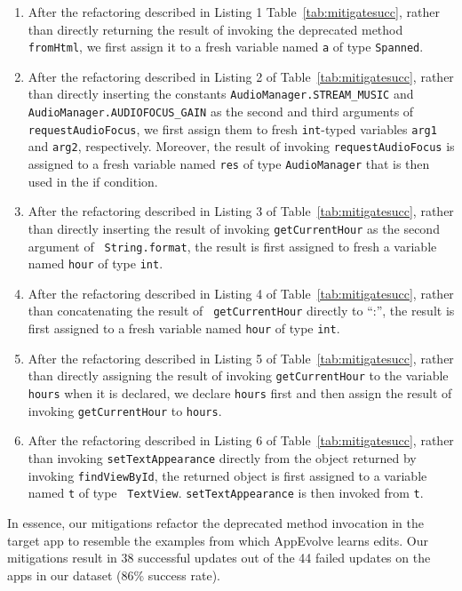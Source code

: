 \begin{enumerate}
\item After the refactoring described in Listing 1
Table~\ref{tab:mitigatesucc}, rather than directly returning the result of
invoking the deprecated method {\tt fromHtml}, we first assign it to a fresh
variable named {\tt a} of type {\tt Spanned}.

\item After the refactoring described in Listing 2 of
Table~\ref{tab:mitigatesucc}, rather than directly inserting the constants
{\tt AudioManager.STREAM\_MUSIC} and {\tt AudioManager.AUDIOFOCUS\_GAIN} as
the second and third arguments of {\tt requestAudioFocus}, we first assign
them to fresh {\tt int}-typed variables {\tt arg1} and {\tt arg2},
respectively. Moreover, the result of invoking {\tt requestAudioFocus} is
assigned to a fresh variable named {\tt res} of type {\tt AudioManager}
that is then used in the if condition.

\item After the refactoring described in Listing 3 of
Table~\ref{tab:mitigatesucc}, rather than directly inserting the result of
invoking {\tt getCurrentHour} as the second argument of {\tt
String.format}, the result is first assigned to fresh a variable named {\tt hour}
of type {\tt int}.

\item After the refactoring described in Listing 4 of
Table~\ref{tab:mitigatesucc}, rather than concatenating the result of {\tt
getCurrentHour} directly to ``:'', the result is first assigned to a fresh
variable named {\tt hour} of type {\tt int}.

\item After the refactoring described in Listing 5 of
Table~\ref{tab:mitigatesucc}, rather than directly assigning the result of
invoking {\tt getCurrentHour} to the variable {\tt hours} when it is
declared, we declare {\tt hours} first and then assign the result of
invoking {\tt getCurrentHour} to {\tt hours}.

\item After the refactoring described in Listing 6 of
Table~\ref{tab:mitigatesucc}, rather than invoking {\tt setTextAppearance}
directly from the object returned by invoking {\tt findViewById}, the
returned object is first assigned to a variable named {\tt t} of type {\tt
TextView}. {\tt setTextAppearance} is then invoked from {\tt t}.

\end{enumerate}

In essence, our mitigations refactor the deprecated method invocation in
the target app to resemble the examples from which AppEvolve learns
edits. Our mitigations result in 38 successful updates out of the 44 failed
updates on the apps in our dataset (86\% success rate).
